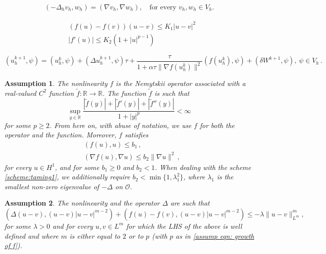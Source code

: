 \documentclass[10pt,a4paper]{amsart}
\newtheorem{assumption}{Assumption}
\newcommand{\R}{\mathbb{R}}
\begin{document}
\begin{align}\label{def:dislap}
(-\Delta_h v_h, w_h)=(\nabla v_h, \nabla w_h), \quad \mbox{for every } v_h, w_h\in V_h.
\end{align}

    \begin{align}
    & (f(u) - f(v))(u-v) \leq K_1 |u-v|^2 \label{C21} \\
    & |f'(u)| \leq K_2 (1+ |u|^{p-1}) \label{C22}
    \end{align}

\begin{equation}\label{scheme:taming1}
(u_h^{k+1}, \psi) = (u_h^{k}, \psi) +  (\Delta u_h^{k+1}, \psi) \tau +
\frac{\tau}{1+\alpha\tau \|\nabla f(u_h^k)\|^2}(f(u_h^{k}), \psi) + (\delta W^{k+1}, \psi), \ \psi\in V_h \,.
\end{equation}

\begin{assumption}\label{assump1}
The nonlinearity  
$f$ is the Nemytskii operator associated with a real-valued $C^2$ function $\tilde{f}:\R\rightarrow \R$. The function $\tilde f$ is such that
\begin{equation}\label{assump eqn: growth of f}
    \sup_{y \in  \R} \frac{|\tilde{f}(y)|+ |\tilde{f}'(y)|+|\tilde{f}''(y)|}{1+|y|^p} < \infty
\end{equation}
for some $p\geq 2$. {\it From here on, with abuse of notation, we use $f$ for both the operator and the function.}
Moreover, $f$ satisfies
\begin{align}
&(f(u),u)\leq b_1 \, ,\label{eqn:coercive drift}\\
&(\nabla f(u), \nabla u)\leq b_2\|\nabla u\|^2 \, , \label{eqn:assump on gradient of drift}
\end{align}
for every $u \in H^1$, and for some $ b_1\geq 0$ and $b_2<1$. When dealing with the scheme \eqref{scheme:taming1}, we additionally require $b_2<\min\{1, \lambda_1^2\}$, where $\lambda_1$ is the smallest non-zero eigenvalue of $-\Delta$ on $\mathcal{O}$. 
\end{assumption}

\begin{assumption}\label{assump:coercivity assumption on overall drift}
The nonlinearity and the operator $\Delta$ are  such that
\begin{equation} 
    (\Delta(u-v), (u-v) |u-v|^{m-2}) + (f(u)-f(v), (u-v) |u-v|^{m-2}) \leq -  \lambda \|u-v\|_{L^m}^m, 
\end{equation}
for some $\lambda>0$ and for every $u,v \in L^m$ for which the LHS of the above is well defined and where $m$ is either equal to  $2$ or to $p$ (with $p$ as in \eqref{assump eqn: growth of f}). 
\end{assumption}
\end{document}
